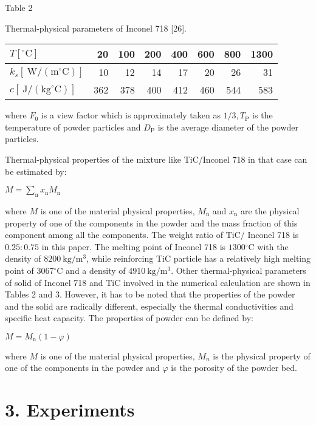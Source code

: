 \documentclass[10pt]{article}
\begin{document}
Table 2

Thermal-physical parameters of Inconel 718 [26].

\begin{center}
\begin{tabular}{lrrrrrrr}
\hline
$T\left[{ }^{\circ} \mathrm{C}\right]$ & 20 & 100 & 200 & 400 & 600 & 800 & 1300 \\
\hline
$k_{s}\left[\mathrm{~W} /\left(\mathrm{m}{ }^{\circ} \mathrm{C}\right)\right]$ & 10 & 12 & 14 & 17 & 20 & 26 & 31 \\
$c\left[\mathrm{~J} /\left(\mathrm{kg}^{\circ} \mathrm{C}\right)\right]$ & 362 & 378 & 400 & 412 & 460 & 544 & 583 \\
\hline
\end{tabular}
\end{center}

where $F_{0}$ is a view factor which is approximately taken as $1 / 3, T_{\mathrm{P}}$ is the temperature of powder particles and $D_{\mathrm{P}}$ is the average diameter of the powder particles.

Thermal-physical properties of the mixture like TiC/Inconel 718 in that case can be estimated by:

$M=\sum_{\mathrm{n}} x_{\mathrm{n}} M_{\mathrm{n}}$

where $M$ is one of the material physical properties, $M_{\mathrm{n}}$ and $x_{\mathrm{n}}$ are the physical property of one of the components in the powder and the mass fraction of this component among all the components. The weight ratio of $\mathrm{TiC} /$ Inconel 718 is $0.25: 0.75$ in this paper. The melting point of Inconel 718 is $1300{ }^{\circ} \mathrm{C}$ with the density of $8200 \mathrm{~kg} / \mathrm{m}^{3}$, while reinforcing TiC particle has a relatively high melting point of $3067{ }^{\circ} \mathrm{C}$ and a density of $4910 \mathrm{~kg} / \mathrm{m}^{3}$. Other thermal-physical parameters of solid of Inconel 718 and TiC involved in the numerical calculation are shown in Tables 2 and 3. However, it has to be noted that the properties of the powder and the solid are radically different, especially the thermal conductivities and specific heat capacity. The properties of powder can be defined by:

$M=M_{\mathrm{n}}(1-\varphi)$

where $M$ is one of the material physical properties, $M_{n}$ is the physical property of one of the components in the powder and $\varphi$ is the porosity of the powder bed.

\section*{3. Experiments}
\end{document}

